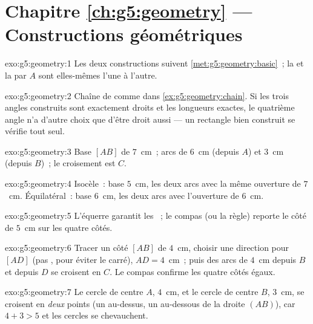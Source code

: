\section*{Chapitre \ref{ch:g5:geometry} --- Constructions géométriques}

\begin{solution}{exo:g5:geometry:1}
Les deux constructions suivent \cref{met:g5:geometry:basic}~; la
 et la  par $A$ sont elles-mêmes
 l'une à l'autre.
\end{solution}

\begin{solution}{exo:g5:geometry:2}
Chaîne de  comme dans \cref{ex:g5:geometry:chain}.
Si les trois angles construits sont exactement droits et les
longueurs exactes, le quatrième angle n'a d'autre choix que d'être
droit aussi --- un rectangle bien construit se vérifie tout seul.
\end{solution}

\begin{solution}{exo:g5:geometry:3}
Base $[AB]$ de $7$~cm~; arcs de  $6$~cm (depuis $A$) et
$3$~cm (depuis $B$)~; le croisement est $C$.
\end{solution}

\begin{solution}{exo:g5:geometry:4}
Isocèle~: base $5$~cm, les deux arcs avec la même ouverture de
$7$~cm. Équilatéral~: base $6$~cm, les deux arcs avec l'ouverture
de $6$~cm.
\end{solution}

\begin{solution}{exo:g5:geometry:5}
L'équerre garantit les ~; le compas (ou la règle)
reporte le côté de $5$~cm sur les quatre côtés.
\end{solution}

\begin{solution}{exo:g5:geometry:6}
Tracer un côté $[AB]$ de $4$~cm, choisir une direction pour $[AD]$
(pas , pour éviter le carré), $AD = 4$~cm~; puis des
arcs de $4$~cm depuis $B$ et depuis $D$ se croisent en $C$. Le
compas confirme les quatre côtés égaux.
\end{solution}

\begin{solution}{exo:g5:geometry:7}
Le cercle de centre $A$,  $4$~cm, et le cercle de centre $B$,
 $3$~cm, se croisent en \emph{deux} points (un au-dessus, un
au-dessous de la droite $(AB)$), car $4 + 3 > 5$ et les cercles se
chevauchent.
\end{solution}

